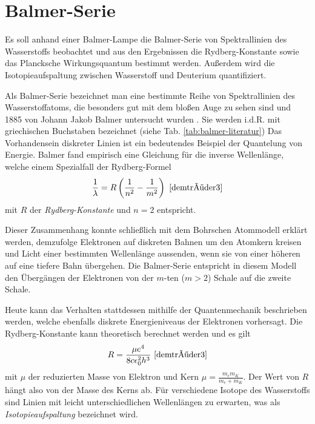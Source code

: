 \documentclass{article}
\begin{document}
\clearpage
\section{Balmer-Serie}
Es soll anhand einer Balmer-Lampe die Balmer-Serie von Spektrallinien des Wasserstoffs beobachtet und aus den Ergebnissen
die Rydberg-Konstante sowie das Plancksche Wirkungsquantum bestimmt werden. Außerdem wird die Isotopieaufspaltung zwischen Wasserstoff und Deuterium quantifiziert.

Als Balmer-Serie bezeichnet man eine bestimmte Reihe von Spektrallinien des Wasserstoffatoms, die besonders gut mit dem bloßen Auge zu sehen sind
und 1885 von Johann Jakob Balmer untersucht wurden \cite[S. 99]{demtröder3}. Sie werden i.d.R. mit griechischen Buchstaben bezeichnet (siehe Tab. \ref{tab:balmer-literatur})
Das Vorhandensein diskreter Linien ist ein bedeutendes Beispiel der Quantelung von Energie.
Balmer fand empirisch eine Gleichung für die inverse Wellenlänge, welche einem Spezialfall der Rydberg-Formel
\begin{equation}
  \frac{1}{\lambda} = R \left(\frac{1}{n^2} - \frac{1}{m^2}\right)\ \cite{demtröder3} \label{eq:rydberg-formel}
\end{equation}
mit $R$ der \textit{Rydberg-Konstante} und $n=2$ entspricht.

Dieser Zusammenhang konnte schließlich mit dem Bohrschen Atommodell erklärt werden, demzufolge Elektronen auf diskreten Bahnen um den Atomkern kreisen
und Licht einer bestimmten Wellenlänge aussenden, wenn sie von einer höheren auf eine tiefere Bahn übergehen.
Die Balmer-Serie entspricht in diesem Modell den Übergängen der Elektronen von der $m$-ten ($m>2$) Schale auf die zweite Schale.

Heute kann das Verhalten stattdessen mithilfe der Quantenmechanik beschrieben werden, welche ebenfalls diskrete Energieniveaus der Elektronen vorhersagt.
Die Rydberg-Konstante kann theoretisch berechnet werden und es gilt
\begin{equation}
  R = \frac{\mu e^4}{8c\epsilon_0^2 h^3}~\cite[S.101]{demtröder3} \label{eq:rydberg-konstante} 
\end{equation}
mit $\mu$ der reduzierten Masse von Elektron und Kern $\mu = \frac{m_e m_K}{m_e+m_K}$.
Der Wert von $R$ hängt also von der Masse des Kerns ab. Für verschiedene Isotope des Wasserstoffs sind Linien mit leicht unterschiedlichen Wellenlängen
zu erwarten, was als \textit{Isotopieaufspaltung} bezeichnet wird.
\end{document}
